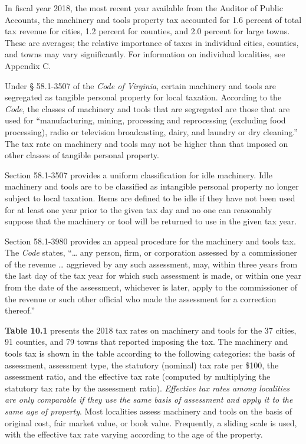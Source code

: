 \documentclass[
]{book}
\begin{document}
In fiscal year 2018, the most recent year available from the Auditor of Public Accounts, the machinery and tools property tax accounted for 1.6 percent of total tax revenue for cities, 1.2 percent for counties, and 2.0 percent for large towns. These are averages; the relative importance of taxes in individual cities, counties, and towns may vary significantly. For information on individual localities, see Appendix C.

Under § 58.1-3507 of the \emph{Code of Virginia}, certain machinery and tools are segregated as tangible personal property for local taxation. According to the \emph{Code}, the classes of machinery and tools that are segregated are those that are used for ``manufacturing, mining, processing and reprocessing (excluding food processing), radio or television broadcasting, dairy, and laundry or dry cleaning.'' The tax rate on machinery and tools may not be higher than that imposed on other classes of tangible personal property.

Section 58.1-3507 provides a uniform classification for idle machinery. Idle machinery and tools are to be classified as intangible personal property no longer subject to local taxation. Items are defined to be idle if they have not been used for at least one year prior to the given tax day and no one can reasonably suppose that the machinery or tool will be returned to use in the given tax year.

Section 58.1-3980 provides an appeal procedure for the machinery and tools tax. The \emph{Code} states, ``\ldots{} any person, firm, or corporation assessed by a commissioner of the revenue \ldots{} aggrieved by any such assessment, may, within three years from the last day of the tax year for which such assessment is made, or within one year from the date of the assessment, whichever is later, apply to the commissioner of the revenue or such other official who made the assessment for a correction thereof.''

\textbf{Table 10.1} presents the 2018 tax rates on machinery and tools for the 37 cities, 91 counties, and 79 towns that reported imposing the tax. The machinery and tools tax is shown in the table according to the following categories: the basis of assessment, assessment type, the statutory (nominal) tax rate per \$100, the assessment ratio, and the effective tax rate (computed by multiplying the statutory tax rate by the assessment ratio). \emph{Effective tax rates among localities are only comparable if they use the same basis of assessment and apply it to the same age of property}. Most localities assess machinery and tools on the basis of original cost, fair market value, or book value. Frequently, a sliding scale is used, with the effective tax rate varying according to the age of the property.
\end{document}
